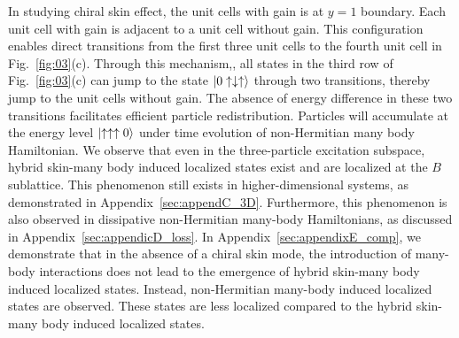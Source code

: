 \documentclass[longbibliography, aps, prx, amsmath, amssymb, amsfonts, twocolumn,superscriptaddress, footinbib]{revtex4-1}
\begin{document}
	In studying chiral skin effect, the unit cells with gain is at $y=1$ boundary. 
	Each unit cell with gain is adjacent to a unit cell without gain. 
	This configuration enables direct transitions from the first three unit cells to the fourth unit cell in Fig.~\ref{fig:03}(c). 
	Through this mechanism,, all states in the third row of Fig.~\ref{fig:03}(c) can jump to the state $\ket{0\uparrow\downarrow\uparrow}$ through two transitions, thereby jump to the unit cells without gain. 
	The absence of energy difference in these two transitions facilitates efficient particle redistribution.
	Particles will accumulate at the energy level $\ket{\uparrow\uparrow\uparrow0}$ under time evolution of non-Hermitian many body Hamiltonian. We observe that even in the three-particle excitation subspace, hybrid skin-many body induced localized states exist and are localized at the $B$ sublattice. 
	This phenomenon still exists in higher-dimensional systems, as demonstrated in Appendix~\ref{sec:appendC_3D}. 
	Furthermore, this phenomenon is also observed in dissipative non-Hermitian many-body Hamiltonians, as discussed in Appendix~\ref{sec:appendicD_loss}.
	In Appendix~\ref{sec:appendixE_comp}, we demonstrate that in the absence of a chiral skin mode, the introduction of many-body interactions does not lead to the emergence of hybrid skin-many body induced localized states. Instead, non-Hermitian many-body induced localized states are observed. These states are less localized compared to the hybrid skin-many body induced localized states.

	
\end{document}
